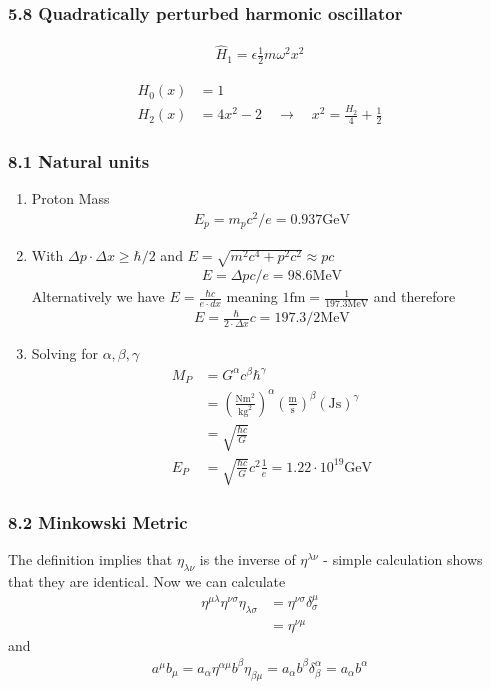 \documentclass[10pt,a4paper]{book}
\theoremstyle{definition}
\begin{document}
\subsubsection{5.8 Quadratically perturbed harmonic oscillator}
\begin{align}
\hat{H}_1=\epsilon\frac{1}{2}m\omega^2x^2
\end{align}

\begin{align}
H_0(x)&=1\\
H_2(x)&=4x^2-2\quad\rightarrow\quad x^2=\frac{H_2}{4}+\frac{1}{2}
\end{align}


\subsubsection{8.1 Natural units}
\begin{enumerate}
\item Proton Mass
\begin{align}
      E_p=m_pc^2/e=0.937\text{GeV}
\end{align}
\item With $\Delta p\cdot\Delta x\ge\hbar/2$ and $E=\sqrt{m^2c^4+p^2c^2}\approx pc$
\begin{align}
	E=\Delta p c/e=98.6\text{MeV}
\end{align}
Alternatively we have $E=\frac{\hbar c}{e\cdot dx}$ meaning $1\text{fm}=\frac{1}{197.3\text{MeV}}$ and therefore
\begin{align}
	E=\frac{\hbar}{2\cdot\Delta x}c=197.3/2\text{MeV}
\end{align}
\item Solving for $\alpha,\beta,\gamma$
\begin{align}
	M_P
	&=G^\alpha c^\beta \hbar^\gamma\\
	&=\left(\frac{\text{Nm}^2}{\text{kg}^2}\right)^\alpha\left(\frac{\text{m}}{\text{s}}\right)^\beta\left(\text{Js}\right)^\gamma\\
	&=\sqrt{\frac{\hbar c}{G}}\\
	E_P&=\sqrt{\frac{\hbar c}{G}}c^2\frac{1}{e}=1.22\cdot10^{19}\text{GeV}
\end{align}
\end{enumerate}
\subsubsection{8.2 Minkowski Metric}
The definition implies that $\eta_{\lambda\nu}$ is the inverse of $\eta^{\lambda\nu}$ - simple calculation shows that they are identical. Now we can calculate
\begin{align}
\eta^{\mu\lambda}\eta^{\nu\sigma}\eta_{\lambda\sigma}
&=\eta^{\nu\sigma}\delta^\mu_\sigma\\
&=\eta^{\nu\mu}
\end{align}
and
\begin{align}
a^\mu b_\mu=a_\alpha\eta^{\alpha\mu}b^\beta\eta_{\beta\mu}=a_\alpha b^\beta\delta^\alpha_\beta=a_\alpha b^\alpha
\end{align}
\end{document}
